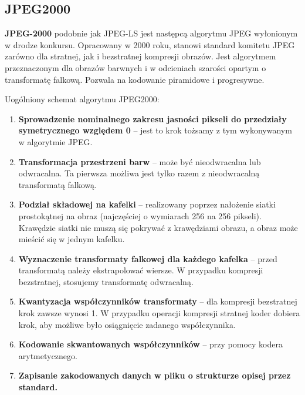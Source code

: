 \subsection{JPEG2000}

\textbf{JPEG-2000} podobnie jak JPEG-LS jest następcą algorytmu JPEG wyłonionym w drodze konkursu. Opracowany w 2000 roku, stanowi standard komitetu JPEG zarówno dla stratnej, jak i bezstratnej kompresji obrazów. Jest algorytmem przeznaczonym dla obrazów barwnych i w odcieniach szarości opartym o transformatę falkową. Pozwala na kodowanie piramidowe i progresywne.

Uogólniony schemat algorytmu JPEG2000:

\begin{enumerate}
	\item \textbf{Sprowadzenie nominalnego zakresu jasności pikseli do przedziały symetrycznego względem 0} -- jest to krok tożsamy z tym wykonywanym w algorytmie JPEG.
	\item \textbf{Transformacja przestrzeni barw} -- może być nieodwracalna lub odwracalna. Ta pierwsza możliwa jest tylko razem z nieodwracalną transformatą falkową.
	\item \textbf{Podział składowej na kafelki} -- realizowany poprzez nałożenie siatki prostokątnej na obraz (najczęściej o wymiarach 256 na 256 pikseli). Krawędzie siatki nie muszą się pokrywać z krawędziami obrazu, a obraz może mieścić się w jednym kafelku.
	\item \textbf{Wyznaczenie transformaty falkowej dla każdego kafelka} -- przed transformatą należy ekstrapolować wiersze. W przypadku kompresji bezstratnej, stosujemy transformatę odwracalną.
	\item \textbf{Kwantyzacja współczynników transformaty} -- dla kompresji bezstratnej krok zawsze wynosi 1. W przypadku operacji kompresji stratnej koder dobiera krok, aby możliwe było osiągnięcie zadanego współczynnika.
	\item \textbf{Kodowanie skwantowanych współczynników} -- przy pomocy kodera arytmetycznego.
	\item \textbf{Zapisanie zakodowanych danych w pliku o strukturze opisej przez standard.}
\end{enumerate}